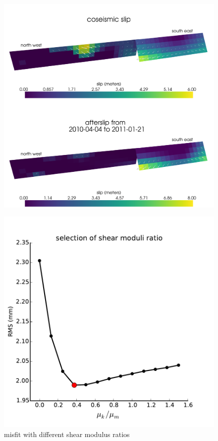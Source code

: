 \documentclass[1p]{elsarticle}
\begin{document}
\begin{figure}
\includegraphics[scale=0.09]{Figures/elasticslip}
\caption{}
\label{fig:InitialSlip}
\end{figure} 


\begin{figure}
\includegraphics[scale=1.0]{Figures/shear_ratio}
\centering 
\caption{misfit with different shear modulus ratios}
\label{fig:ShearModulusRatio}
\end{figure} 
\end{document}
